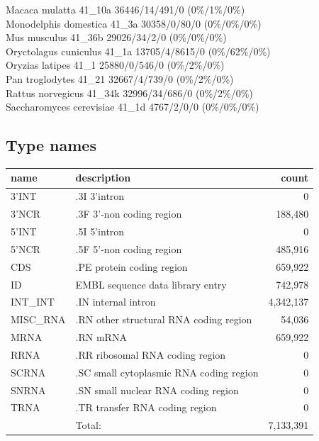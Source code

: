 \documentclass{article}
\begin{document}
\begin{Schunk}
Macaca mulatta                          41\_10a 36446/14/491/0 (0\%/1\%/0\%)\\
Monodelphis domestica                   41\_3a 30358/0/80/0 (0\%/0\%/0\%)\\
Mus musculus                            41\_36b 29026/34/2/0 (0\%/0\%/0\%)\\
Oryctolagus cuniculus                   41\_1a 13705/4/8615/0 (0\%/62\%/0\%)\\
Oryzias latipes                         41\_1 25880/0/546/0 (0\%/2\%/0\%)\\
Pan troglodytes                         41\_21 32667/4/739/0 (0\%/2\%/0\%)\\
Rattus norvegicus                       41\_34k 32996/34/686/0 (0\%/2\%/0\%)\\
Saccharomyces cerevisiae                41\_1d 4767/2/0/0 (0\%/0\%/0\%)

\subsection{Type names}
\noindent\begin{tabular}{llr}
\hline \hline
name & description & count \\
\hline
3'INT  &  .3I 3'intron  &  0 \\
3'NCR  &  .3F  3'-non coding region  &  188,480 \\
5'INT  &  .5I 5'intron  &  0 \\
5'NCR  &  .5F  5'-non coding region  &  485,916 \\
CDS  &  .PE protein coding region  &  659,922 \\
ID  &  EMBL sequence data library entry  &  742,978 \\
INT\_INT  &  .IN  internal intron  &  4,342,137 \\
MISC\_RNA  &  .RN other structural RNA coding region  &  54,036 \\
MRNA  &  .RN mRNA  &  659,922 \\
RRNA  &  .RR ribosomal RNA coding region  &  0 \\
SCRNA  &  .SC small cytoplasmic RNA coding region  &  0 \\
SNRNA  &  .SN small nuclear RNA coding region  &  0 \\
TRNA  &  .TR transfer RNA coding region  &  0 \\
\hline
 & Total: & 7,133,391 \\
\hline \hline
\end{tabular}


\end{Schunk}
\end{document}
